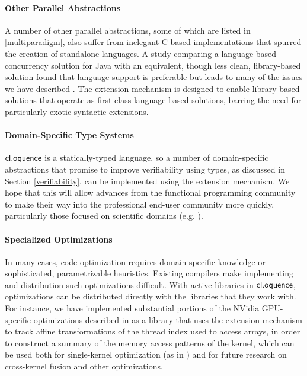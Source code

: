 \documentclass[10pt, conference, compsocconf]{IEEEtran}
\begin{document}
\paragraph{Other Parallel Abstractions}
A number of other parallel abstractions, some of which are listed in \ref{multiparadigm}, also suffer from inelegant C-based implementations that spurred the creation of standalone languages. A study comparing a language-based concurrency solution for Java with an equivalent, though less clean, library-based solution found that language support is preferable but leads to many of the issues we have described \cite{cave2010comparing}. The extension mechanism is designed to enable library-based solutions that operate as first-class language-based solutions, barring the need for particularly exotic syntactic extensions.

\paragraph{Domain-Specific Type Systems}
$\textsf{cl.oquence}$ is a statically-typed language, so a number of domain-specific abstractions that promise to improve verifiability using types, as discussed in Section \ref{verifiability}, can be implemented using the extension mechanism. We hope that this will allow advances from the functional programming community to make their way into the professional end-user community more quickly, particularly those focused on scientific domains (e.g. \cite{conf/cefp/Kennedy09}).

\paragraph{Specialized Optimizations}
In many cases, code optimization requires domain-specific knowledge or sophisticated, parametrizable heuristics. Existing compilers make implementing and distribution such optimizations difficult. With active libraries in $\textsf{cl.oquence}$, optimizations can be distributed directly with the libraries that they work with. For instance, we have implemented substantial portions of the NVidia GPU-specific optimizations described in \cite{yang2010gpgpu} as a library that uses the extension mechanism to track affine transformations of the thread index used to access arrays, in order to construct a summary of the memory access patterns of the kernel, which can be used both for single-kernel optimization (as in \cite{yang2010gpgpu}) and for future research on cross-kernel fusion and other optimizations.
\end{document}
